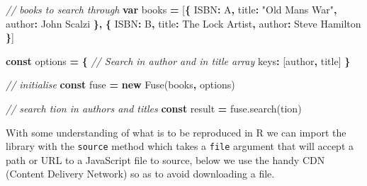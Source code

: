 \documentclass[
]{krantz}
\makeatletter
\newenvironment{Shaded}{\begin{snugshade}}{\end{snugshade}}
\newcommand{\AttributeTok}[1]{\textcolor[rgb]{0.61,0.61,0.61}{#1}}
\newcommand{\CommentTok}[1]{\textcolor[rgb]{0.37,0.37,0.37}{\textit{#1}}}
\newcommand{\DataTypeTok}[1]{\textcolor[rgb]{0.27,0.27,0.27}{#1}}
\newcommand{\KeywordTok}[1]{\textcolor[rgb]{0.27,0.27,0.27}{\textbf{#1}}}
\newcommand{\NormalTok}[1]{#1}
\newcommand{\OperatorTok}[1]{\textcolor[rgb]{0.43,0.43,0.43}{\textbf{#1}}}
\newcommand{\StringTok}[1]{\textcolor[rgb]{0.5,0.5,0.5}{#1}}
\newcommand{\VariableTok}[1]{\textcolor[rgb]{0,0,0}{#1}}
\newenvironment{kframe}{%
\medskip{}
\setlength{\fboxsep}{.8em}
 \def\at@end@of@kframe{}%
 \ifinner\ifhmode%
  \def\at@end@of@kframe{\end{minipage}}%
  \begin{minipage}{\columnwidth}%
 \fi\fi%
 \def\FrameCommand##1{\hskip\@totalleftmargin \hskip-\fboxsep
 \colorbox{shadecolor}{##1}\hskip-\fboxsep
     \hskip-\linewidth \hskip-\@totalleftmargin \hskip\columnwidth}%
 \MakeFramed {\advance\hsize-\width
   \@totalleftmargin\z@ \linewidth\hsize
   \@setminipage}}%
 {\par\unskip\endMakeFramed%
 \at@end@of@kframe}
\renewenvironment{Shaded}{\begin{kframe}}{\end{kframe}}
\makeatother
\begin{document}
\begin{Shaded}
\begin{Highlighting}[]
\CommentTok{// books to search through}
\KeywordTok{var}\NormalTok{ books }\OperatorTok{=}\NormalTok{ [}\OperatorTok{\{}
  \StringTok{\textquotesingle{}ISBN\textquotesingle{}}\OperatorTok{:} \StringTok{\textquotesingle{}A\textquotesingle{}}\OperatorTok{,}
  \StringTok{\textquotesingle{}title\textquotesingle{}}\OperatorTok{:} \StringTok{"Old Man\textquotesingle{}s War"}\OperatorTok{,}
  \StringTok{\textquotesingle{}author\textquotesingle{}}\OperatorTok{:} \StringTok{\textquotesingle{}John Scalzi\textquotesingle{}}
\OperatorTok{\},} \OperatorTok{\{}
  \StringTok{\textquotesingle{}ISBN\textquotesingle{}}\OperatorTok{:} \StringTok{\textquotesingle{}B\textquotesingle{}}\OperatorTok{,}
  \StringTok{\textquotesingle{}title\textquotesingle{}}\OperatorTok{:} \StringTok{\textquotesingle{}The Lock Artist\textquotesingle{}}\OperatorTok{,}
  \StringTok{\textquotesingle{}author\textquotesingle{}}\OperatorTok{:} \StringTok{\textquotesingle{}Steve Hamilton\textquotesingle{}}
\OperatorTok{\}}\NormalTok{]}

\KeywordTok{const}\NormalTok{ options }\OperatorTok{=} \OperatorTok{\{}
  \CommentTok{// Search in \textasciigrave{}author\textasciigrave{} and in \textasciigrave{}title\textasciigrave{} array}
  \DataTypeTok{keys}\OperatorTok{:}\NormalTok{ [}\StringTok{\textquotesingle{}author\textquotesingle{}}\OperatorTok{,} \StringTok{\textquotesingle{}title\textquotesingle{}}\NormalTok{]}
\OperatorTok{\}}

\CommentTok{// initialise}
\KeywordTok{const}\NormalTok{ fuse }\OperatorTok{=} \KeywordTok{new} \AttributeTok{Fuse}\NormalTok{(books}\OperatorTok{,}\NormalTok{ options)}

\CommentTok{// search \textquotesingle{}tion\textquotesingle{} in authors and titles}
\KeywordTok{const}\NormalTok{ result }\OperatorTok{=} \VariableTok{fuse}\NormalTok{.}\AttributeTok{search}\NormalTok{(}\StringTok{\textquotesingle{}tion\textquotesingle{}}\NormalTok{)}
\end{Highlighting}
\end{Shaded}

With some understanding of what is to be reproduced in R we can import the library with the \texttt{source} method which takes a \texttt{file} argument that will accept a path or URL to a JavaScript file to source, below we use the handy CDN (Content Delivery Network) so as to avoid downloading a file.

\begin{Shaded}
\end{Shaded}
\end{document}
